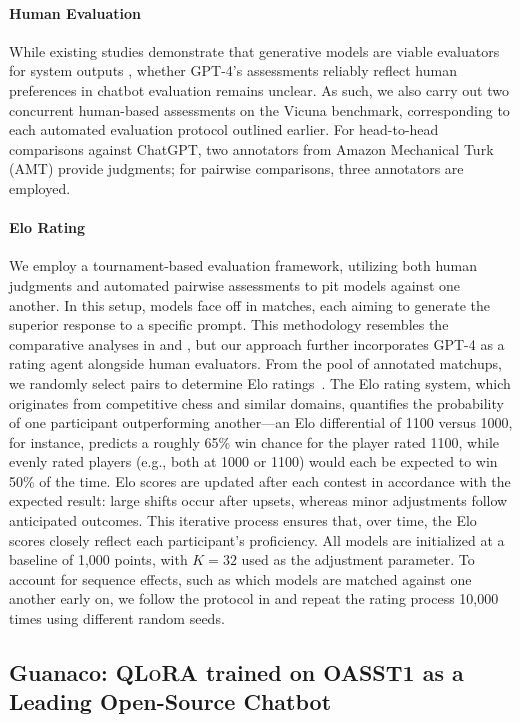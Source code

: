 \paragraph{Human Evaluation} While existing studies demonstrate that generative models are viable evaluators for system outputs \citep{fu2023gptscore}, whether GPT-4’s assessments reliably reflect human preferences in chatbot evaluation remains unclear. As such, we also carry out two concurrent human-based assessments on the Vicuna benchmark, corresponding to each automated evaluation protocol outlined earlier. For head-to-head comparisons against ChatGPT, two annotators from Amazon Mechanical Turk (AMT) provide judgments; for pairwise comparisons, three annotators are employed.

\paragraph{Elo Rating} We employ a tournament-based evaluation framework, utilizing both human judgments and automated pairwise assessments to pit models against one another. In this setup, models face off in matches, each aiming to generate the superior response to a specific prompt. This methodology resembles the comparative analyses in \citet{bai2022training} and \citet{vicuna2023}, but our approach further incorporates GPT-4 as a rating agent alongside human evaluators. From the pool of annotated matchups, we randomly select pairs to determine Elo ratings~\citep{elo1967proposed,elo1978rating}. The Elo rating system, which originates from competitive chess and similar domains, quantifies the probability of one participant outperforming another—an Elo differential of 1100 versus 1000, for instance, predicts a roughly 65\% win chance for the player rated 1100, while evenly rated players (e.g., both at 1000 or 1100) would each be expected to win 50\% of the time. Elo scores are updated after each contest in accordance with the expected result: large shifts occur after upsets, whereas minor adjustments follow anticipated outcomes. This iterative process ensures that, over time, the Elo scores closely reflect each participant's proficiency. All models are initialized at a baseline of 1,000 points, with $K=32$ used as the adjustment parameter. To account for sequence effects, such as which models are matched against one another early on, we follow the protocol in \citet{vicuna2023} and repeat the rating process 10,000 times using different random seeds.

\subsection{\textbf{Guanaco}: \textsc{QLoRA} trained on OASST1 as a Leading Open-Source Chatbot}

